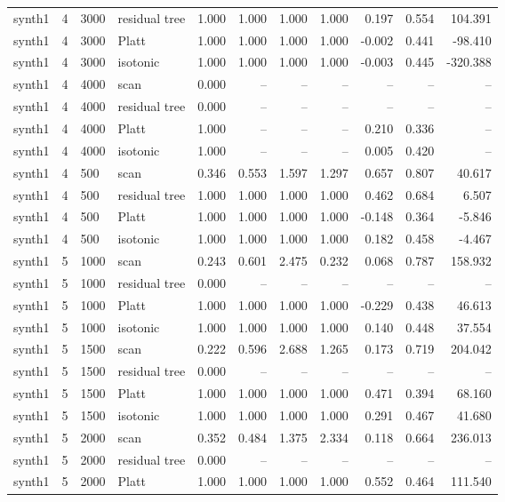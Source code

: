 \begin{tabular}{lrllrrrrrrr}
synth1 & 4 & 3000 & residual tree & 1.000 & 1.000 & 1.000 & 1.000 & 0.197 & 0.554 & 104.391 \\
synth1 & 4 & 3000 & Platt & 1.000 & 1.000 & 1.000 & 1.000 & -0.002 & 0.441 & -98.410 \\
synth1 & 4 & 3000 & isotonic & 1.000 & 1.000 & 1.000 & 1.000 & -0.003 & 0.445 & -320.388 \\
synth1 & 4 & 4000 & scan & 0.000 & -- & -- & -- & -- & -- & -- \\
synth1 & 4 & 4000 & residual tree & 0.000 & -- & -- & -- & -- & -- & -- \\
synth1 & 4 & 4000 & Platt & 1.000 & -- & -- & -- & 0.210 & 0.336 & -- \\
synth1 & 4 & 4000 & isotonic & 1.000 & -- & -- & -- & 0.005 & 0.420 & -- \\
synth1 & 4 & 500 & scan & 0.346 & 0.553 & 1.597 & 1.297 & 0.657 & 0.807 & 40.617 \\
synth1 & 4 & 500 & residual tree & 1.000 & 1.000 & 1.000 & 1.000 & 0.462 & 0.684 & 6.507 \\
synth1 & 4 & 500 & Platt & 1.000 & 1.000 & 1.000 & 1.000 & -0.148 & 0.364 & -5.846 \\
synth1 & 4 & 500 & isotonic & 1.000 & 1.000 & 1.000 & 1.000 & 0.182 & 0.458 & -4.467 \\
synth1 & 5 & 1000 & scan & 0.243 & 0.601 & 2.475 & 0.232 & 0.068 & 0.787 & 158.932 \\
synth1 & 5 & 1000 & residual tree & 0.000 & -- & -- & -- & -- & -- & -- \\
synth1 & 5 & 1000 & Platt & 1.000 & 1.000 & 1.000 & 1.000 & -0.229 & 0.438 & 46.613 \\
synth1 & 5 & 1000 & isotonic & 1.000 & 1.000 & 1.000 & 1.000 & 0.140 & 0.448 & 37.554 \\
synth1 & 5 & 1500 & scan & 0.222 & 0.596 & 2.688 & 1.265 & 0.173 & 0.719 & 204.042 \\
synth1 & 5 & 1500 & residual tree & 0.000 & -- & -- & -- & -- & -- & -- \\
synth1 & 5 & 1500 & Platt & 1.000 & 1.000 & 1.000 & 1.000 & 0.471 & 0.394 & 68.160 \\
synth1 & 5 & 1500 & isotonic & 1.000 & 1.000 & 1.000 & 1.000 & 0.291 & 0.467 & 41.680 \\
synth1 & 5 & 2000 & scan & 0.352 & 0.484 & 1.375 & 2.334 & 0.118 & 0.664 & 236.013 \\
synth1 & 5 & 2000 & residual tree & 0.000 & -- & -- & -- & -- & -- & -- \\
synth1 & 5 & 2000 & Platt & 1.000 & 1.000 & 1.000 & 1.000 & 0.552 & 0.464 & 111.540 \\

\end{tabular}

